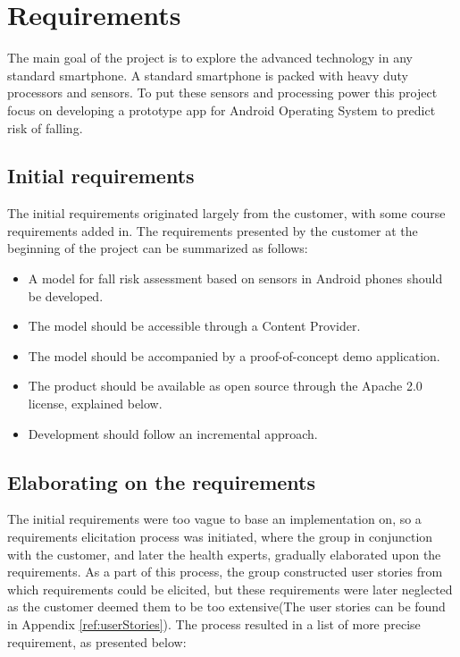\chapter{Requirements}

The main goal of the project is to explore the advanced technology in any standard smartphone. A standard smartphone is packed with heavy duty processors and sensors. To put these sensors and processing power this project focus on developing a prototype app for Android Operating System to predict risk of falling. 

\section{Initial requirements}
The initial requirements originated largely from the customer, with some course requirements added in. The requirements presented by the customer at the beginning of the project can be summarized as follows:

\begin{itemize}
\item A model for fall risk assessment based on sensors in Android phones should be developed.
\item The model should be accessible through a Content Provider.
\item The model should be accompanied by a proof-of-concept demo application.
\item The product should be available as open source through the Apache 2.0 license, explained below.
\item Development should follow an incremental approach.
\end{itemize}

\section{Elaborating on the requirements}
\label{elaboratingrequirements}
The initial requirements were too vague to base an implementation on, so a requirements elicitation process was initiated, where the group in conjunction with the customer, and later the health experts, gradually elaborated upon the requirements. As a part of this process, the group constructed user stories from which requirements could be elicited, but these requirements were later neglected as the customer deemed them to be too extensive(The user stories can be found in Appendix \ref{ref:userStories}). The process resulted in a list of more precise requirement, as presented below:

